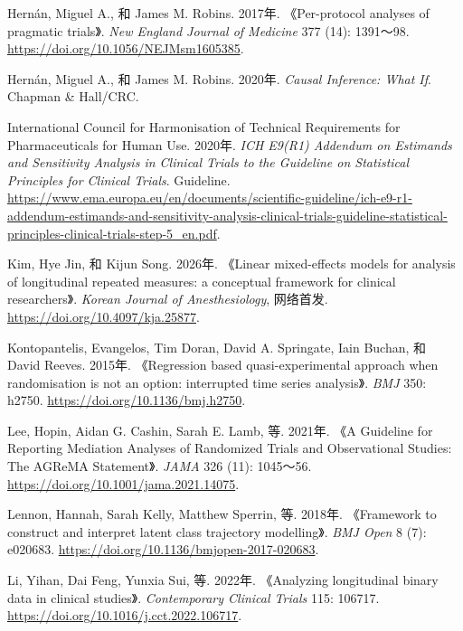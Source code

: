 \documentclass[
  chinese-hans,
  letterpaper,
  DIV=11,
  numbers=noendperiod]{scrreprt}
\newlength{\cslhangindent}
\newenvironment{CSLReferences}[2] %
 {\begin{list}{}{%
  \setlength{\itemindent}{0pt}
  \setlength{\leftmargin}{0pt}
  \setlength{\parsep}{0pt}
  \ifodd #1
   \setlength{\leftmargin}{\cslhangindent}
   \setlength{\itemindent}{-1\cslhangindent}
  \fi
  \setlength{\itemsep}{#2\baselineskip}}}
 {\end{list}}
\begin{document}
\begin{CSLReferences}{1}{1}
Hernán, Miguel A., 和 James M. Robins. 2017年. {《Per-protocol analyses
of pragmatic trials》}. \emph{New England Journal of Medicine} 377 (14):
1391～98. \url{https://doi.org/10.1056/NEJMsm1605385}.

Hernán, Miguel A., 和 James M. Robins. 2020年. \emph{Causal Inference:
What If}. Chapman \& Hall/CRC.

International Council for Harmonisation of Technical Requirements for
Pharmaceuticals for Human Use. 2020年. \emph{{ICH E9(R1)} Addendum on
Estimands and Sensitivity Analysis in Clinical Trials to the Guideline
on Statistical Principles for Clinical Trials}. Guideline.
\url{https://www.ema.europa.eu/en/documents/scientific-guideline/ich-e9-r1-addendum-estimands-and-sensitivity-analysis-clinical-trials-guideline-statistical-principles-clinical-trials-step-5_en.pdf}.

Kim, Hye Jin, 和 Kijun Song. 2026年. {《Linear mixed-effects models for
analysis of longitudinal repeated measures: a conceptual framework for
clinical researchers》}. \emph{Korean Journal of Anesthesiology},
网络首发. \url{https://doi.org/10.4097/kja.25877}.

Kontopantelis, Evangelos, Tim Doran, David A. Springate, Iain Buchan, 和
David Reeves. 2015年. {《Regression based quasi-experimental approach
when randomisation is not an option: interrupted time series
analysis》}. \emph{BMJ} 350: h2750.
\url{https://doi.org/10.1136/bmj.h2750}.

Lee, Hopin, Aidan G. Cashin, Sarah E. Lamb, 等. 2021年. {《A Guideline
for Reporting Mediation Analyses of Randomized Trials and Observational
Studies: The {AGReMA} Statement》}. \emph{JAMA} 326 (11): 1045～56.
\url{https://doi.org/10.1001/jama.2021.14075}.

Lennon, Hannah, Sarah Kelly, Matthew Sperrin, 等. 2018年. {《Framework
to construct and interpret latent class trajectory modelling》}.
\emph{BMJ Open} 8 (7): e020683.
\url{https://doi.org/10.1136/bmjopen-2017-020683}.

Li, Yihan, Dai Feng, Yunxia Sui, 等. 2022年. {《Analyzing longitudinal
binary data in clinical studies》}. \emph{Contemporary Clinical Trials}
115: 106717. \url{https://doi.org/10.1016/j.cct.2022.106717}.


\end{CSLReferences}
\end{document}
